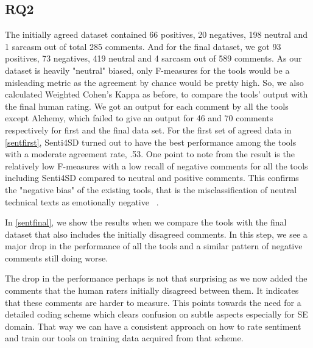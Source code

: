 \subsection{RQ2}
The initially agreed dataset contained 66 positives, 20 negatives, 198 neutral and 1 sarcasm out of total 285 comments. And for the final dataset, we got 93 positives, 73 negatives, 419 neutral and 4 sarcasm out of 589 comments. As our dataset is heavily "neutral" biased, only F-measures for the tools would be a misleading metric as the agreement by chance would be pretty high. So, we also calculated Weighted Cohen's Kappa as before, to compare the tools' output with the final human rating. We got an output for each comment by all the tools except Alchemy, which failed to give an output for 46 and 70 comments respectively for first and the final data set. 
For the first set of agreed data in \ref{sentfirst}, Senti4SD turned out to have the best performance among the tools with a  moderate agreement rate, .53. One point to note from the result is the relatively low F-measures with a low recall of negative comments for all the tools including Senti4SD compared to neutral and positive comments. This confirms the "negative bias" of the existing tools, that is the misclassification of neutral
technical texts as emotionally negative ~\cite{blaz2016sentiment,novielli2015challenges,calefato2017sentiment}.

In \ref{sentfinal}, we show the results when we compare the tools with the final dataset that also includes the initially disagreed comments. In this step, we see a major drop in the performance of all the tools and a similar pattern of negative comments still doing worse.

The drop in the performance perhaps is not that surprising as we now added the comments that the human raters initially disagreed between them. It indicates that these comments are harder to measure. This points towards the need for a detailed coding scheme which clears confusion on subtle aspects especially for SE domain. That way we can have a consistent approach on how to rate sentiment and train our tools on training data acquired from that scheme. 

\vspace{3mm}
\noindent{}

